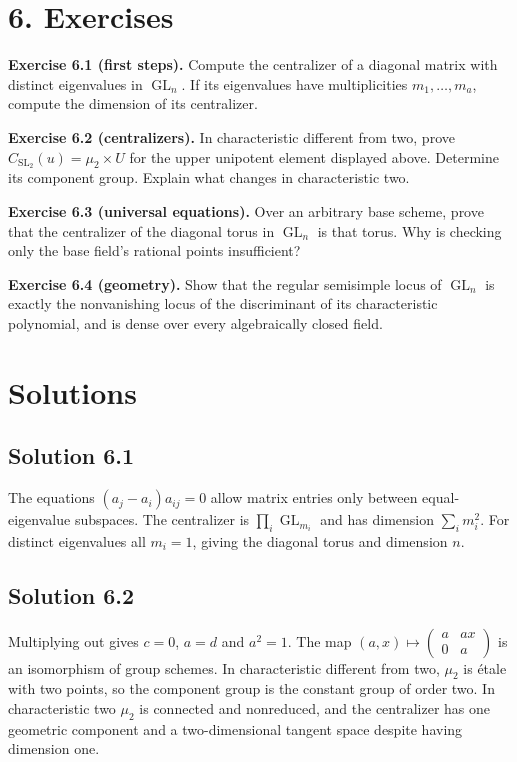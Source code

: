 \documentclass[11pt,a4paper,openany]{report}
\begin{document}
\section{6. Exercises}\label{AG-RG-02-exercises}

\textbf{Exercise 6.1 (first steps).} Compute the centralizer of a diagonal matrix with distinct eigenvalues in \(\operatorname{GL}_n\). If its eigenvalues have multiplicities \(m_1,\ldots,m_a\), compute the dimension of its centralizer.

\textbf{Exercise 6.2 (centralizers).} In characteristic different from two, prove \(C_{\operatorname{SL}_2}(u)=\mu_2\times U\) for the upper unipotent element displayed above. Determine its component group. Explain what changes in characteristic two.

\textbf{Exercise 6.3 (universal equations).} Over an arbitrary base scheme, prove that the centralizer of the diagonal torus in \(\operatorname{GL}_n\) is that torus. Why is checking only the base field's rational points insufficient?

\textbf{Exercise 6.4 (geometry).} Show that the regular semisimple locus of \(\operatorname{GL}_n\) is exactly the nonvanishing locus of the discriminant of its characteristic polynomial, and is dense over every algebraically closed field.

\section{Solutions}\label{AG-RG-02-solutions}

\subsection{Solution 6.1}\label{AG-RG-02-solution-6.1}

The equations \((a_j-a_i)a_{ij}=0\) allow matrix entries only between equal-eigenvalue subspaces. The centralizer is \(\prod_i\operatorname{GL}_{m_i}\) and has dimension \(\sum_i m_i^2\). For distinct eigenvalues all \(m_i=1\), giving the diagonal torus and dimension \(n\).

\subsection{Solution 6.2}\label{AG-RG-02-solution-6.2}

Multiplying out gives \(c=0\), \(a=d\) and \(a^2=1\). The map \((a,x)\mapsto\begin{pmatrix}a&ax\\0&a\end{pmatrix}\) is an isomorphism of group schemes. In characteristic different from two, \(\mu_2\) is étale with two points, so the component group is the constant group of order two. In characteristic two \(\mu_2\) is connected and nonreduced, and the centralizer has one geometric component and a two-dimensional tangent space despite having dimension one.
\end{document}
